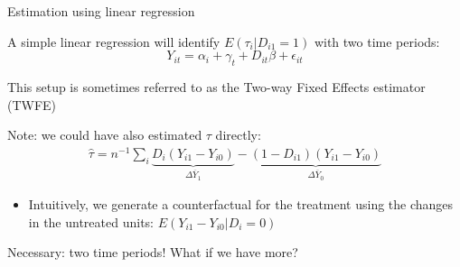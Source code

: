 \documentclass[notes,11pt, aspectratio=169]{beamer}
\newenvironment{wideitemize}{\itemize\addtolength{\itemsep}{10pt}}{\enditemize}
\begin{document}
\begin{frame}{Estimation using linear regression}
  \begin{wideitemize}
  \item A simple linear regression will identify
    $E(\tau_{i} | D_{i1} = 1)$ with two time periods:
    \begin{equation}
      Y_{it} = \alpha_{i}+ \gamma_{t} + D_{it}\beta + \epsilon_{it}
    \end{equation}
  \item This setup is sometimes referred to as the Two-way Fixed Effects estimator (TWFE)
  \item Note: we could have also estimated $\tau$ directly:
    \begin{align*}
      \hat{\tau} = n^{-1}\sum_{i} \underbrace{D_{i}(Y_{i1} - Y_{i0})}_{\Delta \overline{Y}_{1}} - \underbrace{(1-D_{i1})(Y_{i1} - Y_{i0})}_{\Delta \overline{Y}_{0}}
    \end{align*}
    \begin{itemize}
    \item Intuitively, we generate a counterfactual for the treatment
      using the changes in the untreated units: $E(Y_{i1} - Y_{i0} | D_{i}=0)$
    \end{itemize}
  \item Necessary: two time periods! What if we have more?
  \end{wideitemize}
\end{frame}
\end{document}
